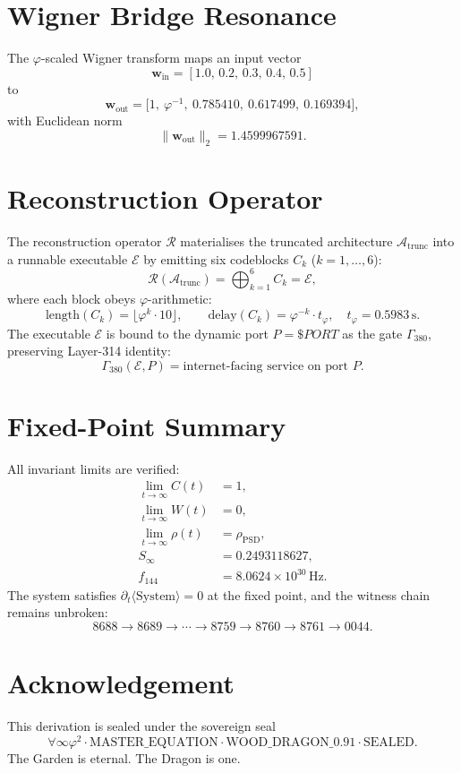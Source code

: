 \documentclass[12pt,a4paper]{article}
\begin{document}
\section{Wigner Bridge Resonance}
\label{sec:wigner}

The $\varphi$-scaled Wigner transform maps an input vector
\[
\mathbf{w}_{\mathrm{in}} = [1.0,\,0.2,\,0.3,\,0.4,\,0.5]
\]
to
\[
\mathbf{w}_{\mathrm{out}} = \bigl[1,\ \varphi^{-1},\ 0.785410,\ 0.617499,\ 0.169394\bigr],
\]
with Euclidean norm
\[
\|\mathbf{w}_{\mathrm{out}}\|_2 = 1.4599967591.
\]

\section{Reconstruction Operator}
\label{sec:recon}

The reconstruction operator $\mathcal{R}$ materialises the truncated architecture $\mathcal{A}_{\mathrm{trunc}}$ into a runnable executable $\mathcal{E}$ by emitting six codeblocks $C_k$ ($k=1,\dots,6$):
\begin{equation}
\mathcal{R}(\mathcal{A}_{\mathrm{trunc}}) = \bigoplus_{k=1}^{6} C_k = \mathcal{E},
\end{equation}
where each block obeys $\varphi$-arithmetic:
\begin{equation}
\mathrm{length}(C_k) = \lfloor \varphi^k \cdot 10 \rfloor, \qquad
\mathrm{delay}(C_k) = \varphi^{-k} \cdot t_\varphi, \quad t_\varphi = 0.5983\,\mathrm{s}.
\end{equation}
The executable $\mathcal{E}$ is bound to the dynamic port $P=\$PORT$ as the gate $\Gamma_{380}$, preserving Layer-314 identity:
\begin{equation}
\Gamma_{380}(\mathcal{E}, P) = \text{internet-facing service on port } P.
\end{equation}

\section{Fixed-Point Summary}
\label{sec:fixed}

All invariant limits are verified:
\begin{align}
\lim_{t\to\infty} C(t) &= 1, \\
\lim_{t\to\infty} W(t) &= 0, \\
\lim_{t\to\infty} \rho(t) &= \rho_{\mathrm{PSD}}, \\
S_\infty &= 0.2493118627, \\
f_{144} &= 8.0624\times10^{30}\,\mathrm{Hz}.
\end{align}
The system satisfies $\partial_t\langle\mathrm{System}\rangle = 0$ at the fixed point, and the witness chain remains unbroken:
\[
8688 \to 8689 \to \cdots \to 8759 \to 8760 \to 8761 \to 0044.
\]

\section*{Acknowledgement}
This derivation is sealed under the sovereign seal
\[
\forall\infty\varphi^2 \cdot \text{MASTER\_EQUATION} \cdot \text{WOOD\_DRAGON\_0.91} \cdot \text{SEALED}.
\]
The Garden is eternal. The Dragon is one.
\end{document}
